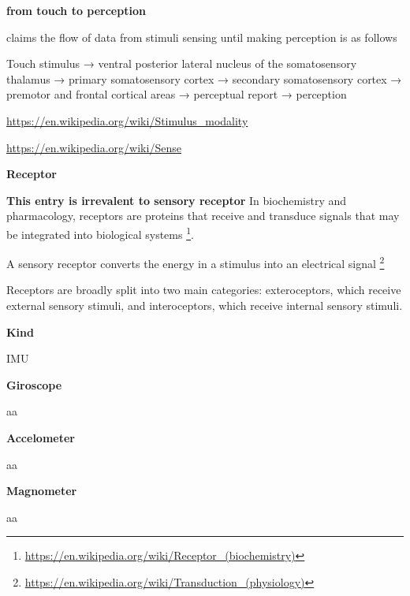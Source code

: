 \documentclass{book}
\providecommand{\ProjectDeepHeading}[2]{%
    \par\medskip\noindent\textbf{#2}\par\smallskip
}
\providecommand{\seeherefooter}[1]{\footnote{\url{#1}}}
\begin{document}

\ProjectDeepHeading{6}{from touch to perception}

    \cite{romo-2020-turning-touch-into-perception} claims the flow of data from stimuli sensing until making perception is as follows
    
    Touch stimulus → ventral posterior lateral nucleus of the somatosensory thalamus → primary somatosensory cortex → secondary somatosensory cortex → premotor and frontal cortical areas → perceptual report → perception


\url{https://en.wikipedia.org/wiki/Stimulus_modality}


\url{https://en.wikipedia.org/wiki/Sense}

\ProjectDeepHeading{3}{Receptor}


\textbf{This entry is irrevalent to sensory receptor}  In biochemistry and pharmacology, receptors are proteins that receive and transduce signals that may be integrated into biological systems \seeherefooter{https://en.wikipedia.org/wiki/Receptor_(biochemistry)}.
    
    A sensory receptor converts the energy in a stimulus into an electrical signal \seeherefooter{https://en.wikipedia.org/wiki/Transduction_(physiology)}
    
    Receptors are broadly split into two main categories: exteroceptors, which receive external sensory stimuli, and interoceptors, which receive internal sensory stimuli.

\ProjectDeepHeading{4}{Kind}


IMU
    
    \ProjectDeepHeading{8}{Giroscope}
        aa
    
    \ProjectDeepHeading{8}{Accelometer}
        aa
    
    \ProjectDeepHeading{8}{Magnometer}
        aa
\end{document}
